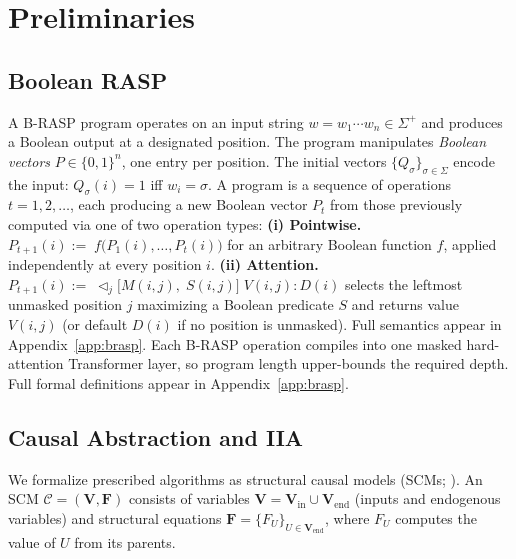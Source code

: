 \documentclass[11pt]{article}
\begin{document}
\section{Preliminaries}
\label{sec:prelim}

\subsection{Boolean RASP}
\label{sec:brasp}

A B-RASP program \citep{DBLP:conf/nips/Yang0A24} operates on an input string $w = w_1 \cdots w_n \in \Sigma^+$ and produces a Boolean output at a designated position.
The program manipulates \emph{Boolean vectors} $P \in \{0,1\}^n$, one entry per position.
The initial vectors $\{Q_\sigma\}_{\sigma \in \Sigma}$ encode the input: $Q_\sigma(i) = 1$ iff $w_i = \sigma$.
A program is a sequence of operations $t = 1, 2, \ldots$, each producing a new Boolean vector $P_t$ from those previously computed via one of two operation types: \textbf{(i) Pointwise.} $P_{t+1}(i) {:=}\; f\!\bigl(P_1(i), \ldots, P_t(i)\bigr)$ for an arbitrary Boolean function $f$, applied independently at every position $i$. \textbf{(ii) Attention.} $P_{t+1}(i) {:=}\; \triangleleft_j\bigl[M(i,j),\; S(i,j)\bigr]\; V\!(i,j) : D(i)$ selects the leftmost unmasked position $j$ maximizing a Boolean predicate $S$ and returns value $V\!(i,j)$ (or default $D(i)$ if no position is unmasked). Full semantics appear in Appendix~\ref{app:brasp}.
Each B-RASP operation compiles into one masked hard-attention Transformer layer, so program length upper-bounds the required depth.
Full formal definitions appear in Appendix~\ref{app:brasp}.

\subsection{Causal Abstraction and IIA}
\label{sec:causal-abstraction}

We formalize prescribed algorithms as structural causal models (SCMs; \citealp{pearl2009causality}).
An SCM $\mathcal{C} = (\mathbf{V}, \mathbf{F})$ consists of variables $\mathbf{V} = \mathbf{V}_{\mathrm{in}} \cup \mathbf{V}_{\mathrm{end}}$ (inputs and endogenous variables) and structural equations $\mathbf{F} = \{F_U\}_{U \in \mathbf{V}_{\mathrm{end}}}$, where $F_U$ computes the value of $U$ from its parents.
\end{document}
